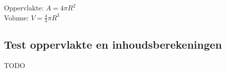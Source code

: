 


		
\begin{ftonthoud}
			Oppervlakte: $A=4\pi R^2$
		\\
		Volume: $V=\frac{4}{3}\pi R^3$
\end{ftonthoud}


\subsection{Test oppervlakte en inhoudsberekeningen}
TODO